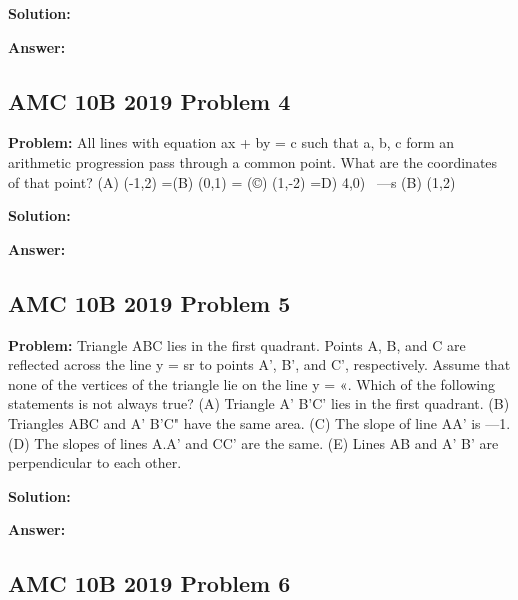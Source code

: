 \documentclass{article}
\newenvironment{problem}{\textbf{Problem: }}{\\}
\newenvironment{solution}{\textbf{Solution: }}{\\}
\newenvironment{answer}{\textbf{Answer: }}{\\}
\begin{document}
\begin{solution}
\end{solution}

\begin{answer}
\end{answer}

\subsection{AMC 10B 2019 Problem 4}

\begin{problem}
All lines with equation ax + by = c such that a, b, c form an arithmetic progression pass through a common point. What are the coordinates of that point? (A) (-1,2) =(B) (0,1) = (©) (1,-2) =D) 4,0) ~—s (B) (1,2)
\end{problem}

\begin{solution}
\end{solution}

\begin{answer}
\end{answer}

\subsection{AMC 10B 2019 Problem 5}

\begin{problem}
Triangle ABC lies in the first quadrant. Points A, B, and C are reflected across the line y = sr to points A’, B’, and C’, respectively. Assume that none of the vertices of the triangle lie on the line y = «. Which of the following statements is not always true? (A) Triangle A’ B’C’ lies in the first quadrant. (B) Triangles ABC and A’ B’C" have the same area. (C) The slope of line AA’ is —1. (D) The slopes of lines A.A’ and CC’ are the same. (E) Lines AB and A’ B’ are perpendicular to each other.
\end{problem}

\begin{solution}
\end{solution}

\begin{answer}
\end{answer}

\subsection{AMC 10B 2019 Problem 6}
\end{document}
